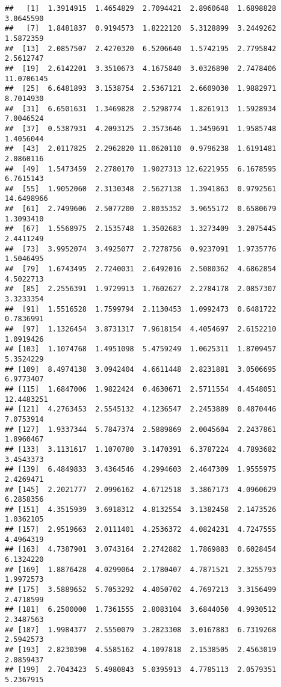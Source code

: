 \documentclass[
]{article}
\begin{document}
\begin{verbatim}
##   [1]  1.3914915  1.4654829  2.7094421  2.8960648  1.6898828  3.0645590
##   [7]  1.8481837  0.9194573  1.8222120  5.3128899  3.2449262  1.5872359
##  [13]  2.0857507  2.4270320  6.5206640  1.5742195  2.7795842  2.5612747
##  [19]  2.6142201  3.3510673  4.1675840  3.0326890  2.7478406 11.0706145
##  [25]  6.6481893  3.1538754  2.5367121  2.6609030  1.9882971  8.7014930
##  [31]  6.6501631  1.3469828  2.5298774  1.8261913  1.5928934  7.0046524
##  [37]  0.5387931  4.2093125  2.3573646  1.3459691  1.9585748  1.4056044
##  [43]  2.0117825  2.2962820 11.0620110  0.9796238  1.6191481  2.0860116
##  [49]  1.5473459  2.2780170  1.9027313 12.6221955  6.1678595  6.7615143
##  [55]  1.9052060  2.3130348  2.5627138  1.3941863  0.9792561 14.6498966
##  [61]  2.7499606  2.5077200  2.8035352  3.9655172  0.6580679  1.3093410
##  [67]  1.5568975  2.1535748  1.3502683  1.3273409  3.2075445  2.4411249
##  [73]  3.9952074  3.4925077  2.7278756  0.9237091  1.9735776  1.5046495
##  [79]  1.6743495  2.7240031  2.6492016  2.5080362  4.6862854  4.5022713
##  [85]  2.2556391  1.9729913  1.7602627  2.2784178  2.0857307  3.3233354
##  [91]  1.5516528  1.7599794  2.1130453  1.0992473  0.6481722  0.7836991
##  [97]  1.1326454  3.8731317  7.9618154  4.4054697  2.6152210  1.0919426
## [103]  1.1074768  1.4951098  5.4759249  1.0625311  1.8709457  5.3524229
## [109]  8.4974138  3.0942404  4.6611448  2.8231881  3.0506695  6.9773407
## [115]  1.6847006  1.9822424  0.4630671  2.5711554  4.4548051 12.4483251
## [121]  4.2763453  2.5545132  4.1236547  2.2453889  0.4870446  7.0753914
## [127]  1.9337344  5.7847374  2.5889869  2.0045604  2.2437861  1.8960467
## [133]  3.1131617  1.1070780  3.1470391  6.3787224  4.7893682  3.4543373
## [139]  6.4849833  3.4364546  4.2994603  2.4647309  1.9555975  2.4269471
## [145]  2.2021777  2.0996162  4.6712518  3.3867173  4.0960629  6.2858356
## [151]  4.3515939  3.6918312  4.8132554  3.1382458  2.1473526  1.0362105
## [157]  2.9519663  2.0111401  4.2536372  4.0824231  4.7247555  4.4964319
## [163]  4.7387901  3.0743164  2.2742882  1.7869883  0.6028454  6.1324220
## [169]  1.8876428  4.0299064  2.1780407  4.7871521  2.3255793  1.9972573
## [175]  3.5889652  5.7053292  4.4050702  4.7697213  3.3156499  2.4718599
## [181]  6.2500000  1.7361555  2.8083104  3.6844050  4.9930512  2.3487563
## [187]  1.9984377  2.5550079  3.2823308  3.0167883  6.7319268  2.5942573
## [193]  2.8230390  4.5585162  4.1097818  2.1538505  2.4563019  2.0859437
## [199]  2.7043423  5.4980843  5.0395913  4.7785113  2.0579351  5.2367915

\end{verbatim}
\end{document}
